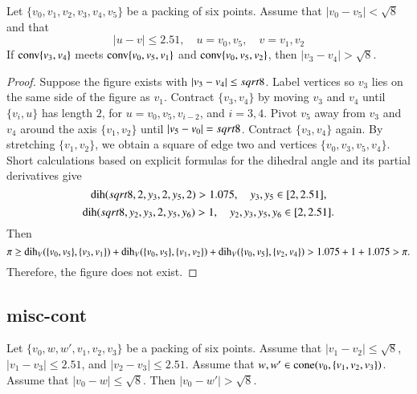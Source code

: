 \begin{tarskidata}
\begin{tarski}
\begin{lemma} 
Let $\{v_0,v_1,v_2,v_3,v_4,v_5\}$ be a packing of six points.
Assume that $|v_0-v_5|<\sqrt8$ and that
  $$|u-v| \le 2.51,\quad u=v_0,v_5,\quad v = v_1,v_2$$
If ${\operatorname{conv}}\{v_3,v_4\}$ meets 
${\operatorname{conv}}\{v_0,v_5,v_1\}$ and ${\operatorname{conv}}\{v_0,v_5,v_2\}$,
then $|v_3-v_4|>\sqrt8$.
\end{lemma}

\begin{proof}
Suppose the figure exists with $|v_3-v_4|\le sqrt8$. Label vertices
so $v_3$ lies on the same side of the figure as $v_1$. Contract
$\{v_3,v_4\}$ by moving $v_3$ and $v_4$ until
    $\{v_i,u\}$ has length $2$,
for $u=v_0,v_5,v_{i-2}$, and $i=3,4$. Pivot $v_5$ away from $v_3$ and
$v_4$ around the axis $\{v_1,v_2\}$ until
    $|v_5-v_0|=sqrt8$.
Contract $\{v_3,v_4\}$ again. By stretching $\{v_1,v_2\}$, we
obtain a square of edge two and vertices $\{v_0,v_3,v_5,v_4\}$. Short
calculations based on explicit formulas for the dihedral angle and
its partial derivatives give
    $$
        \operatorname{dih}(sqrt8,2,y_3,2,y_5,2) > 1.075,\quad
        y_3,y_5\in[2,2.51],
    $$
    $$
    \operatorname{dih}(sqrt8,y_2,y_3,2,y_5,y_6) >1,\quad
        y_2,y_3,y_5,y_6\in[2,2.51].
   $$
Then
$$\pi\ge \operatorname{dih}_V(\{v_0,v_5\},\{v_3,v_1\}) + \operatorname{dih}_V(\{v_0,v_5\},\{v_1,v_2\}) + 
\operatorname{dih}_V(\{v_0,v_5\},\{v_2,v_4\})
    > 1.075 + 1 + 1.075 > \pi .$$
Therefore, the figure does not exist.
\end{proof}
\end{tarski}










\begin{tarski}
\subsection{misc-cont}

\begin{lemma} 
Let $\{v_0,w,w',v_1,v_2,v_3\}$ be a packing of six points.
Assume that  $|v_1-v_2|\le\sqrt8$,
$|v_1-v_3|\le 2.51$, and $|v_2-v_3|\le 2.51$.
Assume that $w,w'\in{\operatorname{cone}}(v_0,\{v_1,v_2,v_3\})$.
Assume that $|v_0-w|\le\sqrt8$.  Then $|v_0-w'| > \sqrt8$.
\end{lemma}


\end{tarski}
\end{tarskidata}
